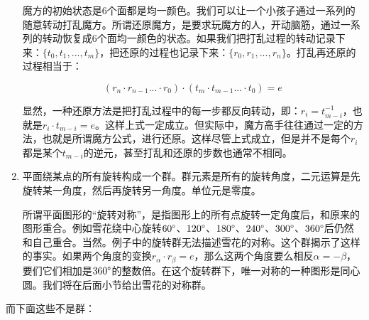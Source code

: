 \documentclass[b5paper]{ctexart}
\begin{document}
\begin{enumerate}
魔方的初始状态是6个面都是均一颜色。我们可以让一个小孩子通过一系列的随意转动打乱魔方。所谓还原魔方，是要求玩魔方的人，开动脑筋，通过一系列的转动恢复成6个面均一颜色的状态。如果我们把打乱过程的转动记录下来：$\{t_0, t_1, ..., t_m\}$，把还原的过程也记录下来：$\{r_0, r_1, ..., r_n\}$。打乱再还原的过程相当于：

\[
  (r_n \cdot r_{n-1} ... \cdot r_0) \cdot (t_m \cdot t_{m-1} ... \cdot t_0) = e
\]

显然，一种还原方法是把打乱过程中的每一步都反向转动，即：$r_i = t_{m-i}^{-1}$，也就是$r_i \cdot t_{m-i} = e$。这样上式一定成立。但实际中，魔方高手往往通过一定的方法，也就是所谓魔方公式，进行还原。这样尽管上式成立，但是并不是每个$r_i$都是某个$t_{m-i}$的逆元，甚至打乱和还原的步数也通常不相同。

\item 平面绕某点的所有旋转构成一个群。群元素是所有的旋转角度，二元运算是先旋转某一角度，然后再旋转另一角度。单位元是零度。

所谓平面图形的“旋转对称”，是指图形上的所有点旋转一定角度后，和原来的图形重合。例如雪花绕中心旋转$60\degree$、$120\degree$、$180\degree$、$240\degree$、$300\degree$、$360\degree$后仍然和自己重合。当然。例子中的旋转群无法描述雪花的对称。这个群揭示了这样的事实。如果两个角度的变换$r_{\alpha} \cdot r_{\beta} = e$，那么这两个角度要么相反$\alpha = -\beta$，要们它们相加是$360\degree$的整数倍。在这个旋转群下，唯一对称的一种图形是同心圆。我们将在后面小节给出雪花的对称群。

\end{enumerate}

而下面这些不是群：
\end{document}

